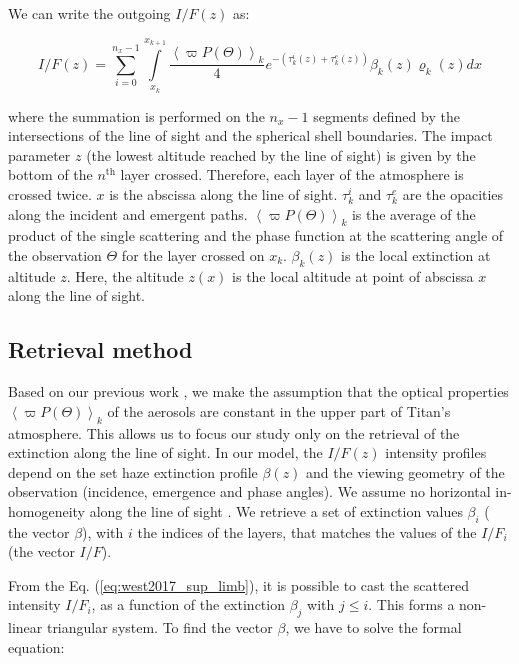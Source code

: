 We can write the outgoing $I/F (z)$ as:

\begin{equation}
I/F (z) = \sum_{i=0}^{n_x-1} \int\limits_{x_k}^{x_{k+1}}
\frac{\left< \varpi P(\Theta) \right>_k}{4}
e^{-\left( \tau^i_k\left(z\right) + \tau^e_k\left(z\right) \right)}
\beta_k\left(z\right) \varrho_k\left(z\right) d{x}
\label{eq:west2017_sup_limb}
\end{equation}

where the summation is performed on the $n_x-1$ segments defined by the intersections of the line of sight and the
spherical shell boundaries. The impact parameter $z$ (the lowest altitude reached by the line of sight) is given by the
bottom of the $n^\mathrm{th}$ layer crossed. Therefore, each layer of the atmosphere is crossed twice. $x$ is the
abscissa along the line of sight. $\tau^i_k$ and $\tau^e_k$ are the opacities along the incident and emergent paths.
$\left< \varpi P(\Theta)\right>_k$ is the average of the product of the single scattering and the phase function
at the scattering angle of the observation $\Theta$ for the layer crossed on $x_k$.  $\beta_k(z)$ is the local
extinction at altitude $z$. Here, the altitude $z(x)$ is the local altitude at point of abscissa $x$ along the
line of sight.


\subsection{Retrieval method}

Based on our previous work \citep{Seignovert2017, West2018}, we make the assumption that the optical properties
$\left<\varpi P(\Theta)\right>_k$ of the aerosols are constant in the upper part of Titan's atmosphere. This allows
us to focus our study only on the retrieval of the extinction along the line of sight.
In our model, the $I/F (z)$ intensity profiles depend on the set haze extinction profile $\beta(z)$ and the viewing
geometry of the observation (incidence, emergence and phase angles).
We assume no horizontal in-homogeneity along the line of sight \citep{Seignovert2017}. We retrieve a set of extinction values $\beta_i$ (
the vector ${\beta}$), with $i$ the indices of the layers, that matches the values of the $I/F_i$
(the vector $I/F$).

From the Eq. (\ref{eq:west2017_sup_limb}), it is possible to cast the scattered intensity $I/F_i$, as a function of
the extinction $\beta_j$ with $j \le i$. This forms a non-linear triangular system. To find the vector $\beta$, we
have to solve the formal equation:

